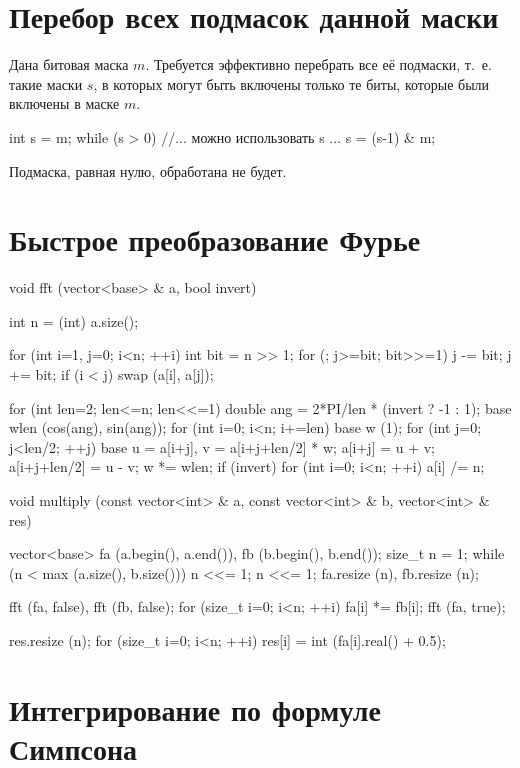 \documentclass[12pt, titlepage]{article}
\begin{document}
\section{Перебор всех подмасок данной маски}
Дана битовая маска $m$. Требуется эффективно перебрать все её подмаски, т.~е. такие маски $s$, в которых могут быть включены только те биты, которые были включены в маске $m$.
\begin{cppcode}
int s = m;
while (s > 0) {
    //... можно использовать s ...
    s = (s-1) & m;
}
\end{cppcode}
Подмаска, равная нулю, обработана не будет.


\section{Быстрое преобразование Фурье}
\begin{cppcode}
void fft (vector<base> & a, bool invert) {
    int n = (int) a.size();

    for (int i=1, j=0; i<n; ++i) {
        int bit = n >> 1;
        for (; j>=bit; bit>>=1)
            j -= bit;
        j += bit;
        if (i < j)
            swap (a[i], a[j]);
    }

    for (int len=2; len<=n; len<<=1) {
        double ang = 2*PI/len * (invert ? -1 : 1);
        base wlen (cos(ang), sin(ang));
        for (int i=0; i<n; i+=len) {
            base w (1);
            for (int j=0; j<len/2; ++j) {
                base u = a[i+j],  v = a[i+j+len/2] * w;
                a[i+j] = u + v;
                a[i+j+len/2] = u - v;
                w *= wlen;
            }
        }
    }
    if (invert)
        for (int i=0; i<n; ++i)
            a[i] /= n;
}

void multiply (const vector<int> & a, const vector<int> & b, vector<int> & res) {
    vector<base> fa (a.begin(), a.end()),  fb (b.begin(), b.end());
    size_t n = 1;
    while (n < max (a.size(), b.size()))  n <<= 1;
    n <<= 1;
    fa.resize (n),  fb.resize (n);

    fft (fa, false),  fft (fb, false);
    for (size_t i=0; i<n; ++i)
        fa[i] *= fb[i];
    fft (fa, true);

    res.resize (n);
    for (size_t i=0; i<n; ++i)
        res[i] = int (fa[i].real() + 0.5);
}
\end{cppcode}

\section{Интегрирование по формуле Симпсона}
\end{document}
